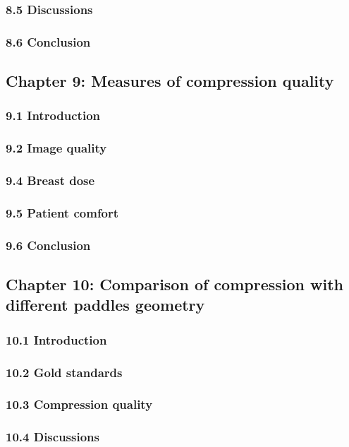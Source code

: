 \subsubsection*{8.5 Discussions}
\subsubsection*{8.6 Conclusion }

\subsection*{Chapter 9: Measures of compression quality}
\subsubsection*{9.1 Introduction }
\subsubsection*{9.2 Image quality }
\subsubsection*{9.4 Breast dose }
\subsubsection*{9.5 Patient comfort}

\subsubsection*{9.6 Conclusion  }

\newpage
\subsection*{Chapter 10: Comparison of compression with different paddles geometry}
\subsubsection*{10.1 Introduction }
\subsubsection*{10.2 Gold standards }
\subsubsection*{10.3 Compression quality  }
\subsubsection*{10.4 Discussions}
